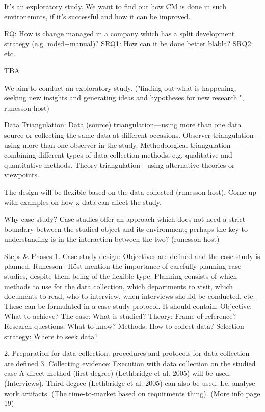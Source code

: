 \documentclass[times, 10pt,twocolumn]{IEEEtran}
\begin{document}
It's an exploratory study. We want to find out how CM is done in such environemnts, if it's successful and how it can be improved. 

RQ: How is change managed in a company which has a split development strategy (e.g. mdsd+manual)?
SRQ1: How can it be done better blabla?
SRQ2: etc. 

TBA

We aim to conduct an exploratory study. ("finding out what is happening, seeking new insights and generating ideas
and hypotheses for new research.", runesson host)

Data Triangulation:
Data (source) triangulation—using more than one data source or collecting the same
data at different occasions.
Observer triangulation—using more than one observer in the study.
Methodological triangulation—combining different types of data collection methods,
e.g. qualitative and quantitative methods.
Theory triangulation—using alternative theories or viewpoints.

The design will be flexible based on the data collected (runesson host). 
	Come up with examples on how x data can affect the study. 


Why case study? 
Case studies offer an approach which does not need a strict boundary between the studied object and its environment; perhaps the key to understanding is in the interaction between the two? (runesson host)

Steps \& Phases
1. Case study design: Objectives are defined and the case study is planned. 
Runesson+Höst mention the importance of carefully planning case studies, despite them being of the flexible type. 
Planning consists of which methods to use for the data collection, which departments to visit, which documents to read, who to interview, when interviews should be conducted, etc. These can be formulated in a case study protocol. 
It should contain: 
Objective: What to achieve?
The case: What is studied?
Theory: Frame of reference?
Research questions: What to know?
Methods: How to collect data?
Selection strategy: Where to seek data?

2. Preparation for data collection: procedures and protocols for data collection are defined
3. Collecting evidence: Execution with data collection on the studied case
A direct method (first degree) (Lethbridge et al. 2005) will be used. (Interviews).
Third degree (Lethbridge et al. 2005) can also be used. I.e. analyse work artifacts. (The time-to-market based on requirments thing). (More info page 19)
\end{document}

